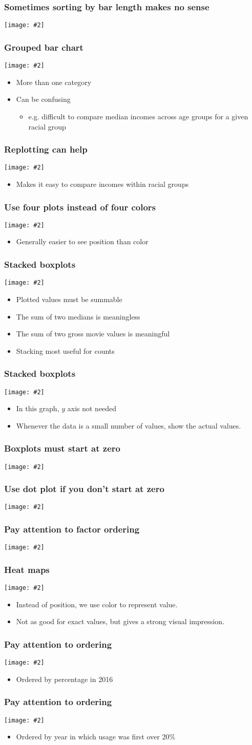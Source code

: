 \documentclass{beamer}
\newcommand{\bi}{\begin{itemize}}
\newcommand{\li}{\item}
\newcommand{\ei}{\end{itemize}}
\newcommand{\fig}[2]{\centerline{\texttt{[image: \#2]}}}
\newcommand{\bfr}[1]{\begin{frame}[fragile]\frametitle{{ #1 }}}
\begin{document}
\bfr{Sometimes sorting by bar length makes no sense}

\fig{1}{income-by-age-sorted-1.png}
\end{frame}


\bfr{Grouped bar chart}
\fig{1}{income-by-age-race-dodged-1.png}
\bi
\li More than one category
\li Can be confusing
\bi\li e.g. difficult to  compare median incomes across age groups for a given racial group\ei
\ei
\end{frame}

\bfr{Replotting can help}
\fig{1}{income-by-race-age-dodged-1.png}

\bi
\li Makes it easy to compare incomes within racial groups
\ei
\end{frame}

\bfr{Use four plots instead of four colors}
\fig{1}{income-by-age-race-faceted-1.png}
\bi
\li Generally easier to see position than color
\ei
\end{frame}



\bfr{Stacked boxplots}
\fig{.8}{titanic-passengers-by-class-sex-1.png}
\bi
\li Plotted values must be summable
\li The sum of two medians is meaningless
\li The sum of two gross movie values is meaningful
\li Stacking most useful for counts
\ei
\end{frame}

\bfr{Stacked boxplots}
\fig{.8}{titanic-passengers-by-class-sex-1.png}
\bi
\li 
In this graph, $y$ axis not needed
\li  Whenever the data is a small number of values, show the
actual values.
\ei
\end{frame}

\bfr{Boxplots must start at zero}

\fig{.8}{Americas-life-expect-bars-1.png}
\end{frame}

\bfr{Use dot plot if you don't start at zero}
\fig{.8}{Americas-life-expect-1.png}
\end{frame}



\bfr{Pay attention to factor ordering}
\fig{.8}{Americas-life-expect-bad-1.png}
\end{frame}

\bfr{Heat maps}
\fig{1}{internet-over-time-1.png}
\scriptsize
\bi
\li Instead of position, we use color to represent value.
\li Not as good for exact values, but gives a strong visual impression.
\ei
\end{frame}

\bfr{Pay attention to ordering}
\fig{1}{internet-over-time-1.png}
\bi
\li Ordered by percentage in 2016
\ei
\end{frame}

\bfr{Pay attention to ordering}
\fig{1}{internet-over-time2-1.png}
\bi
\li Ordered by year in which usage was first over 20\%
\ei
\end{frame}
\end{document}
